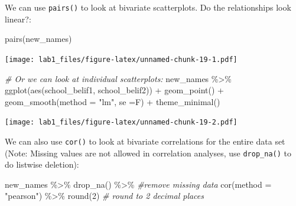 \documentclass[
]{article}
\newenvironment{Shaded}{\begin{snugshade}}{\end{snugshade}}
\newcommand{\AttributeTok}[1]{\textcolor[rgb]{0.77,0.63,0.00}{#1}}
\newcommand{\CommentTok}[1]{\textcolor[rgb]{0.56,0.35,0.01}{\textit{#1}}}
\newcommand{\DecValTok}[1]{\textcolor[rgb]{0.00,0.00,0.81}{#1}}
\newcommand{\FunctionTok}[1]{\textcolor[rgb]{0.00,0.00,0.00}{#1}}
\newcommand{\NormalTok}[1]{#1}
\newcommand{\SpecialCharTok}[1]{\textcolor[rgb]{0.00,0.00,0.00}{#1}}
\newcommand{\StringTok}[1]{\textcolor[rgb]{0.31,0.60,0.02}{#1}}
\begin{document}
We can use \texttt{pairs()} to look at bivariate scatterplots. Do the
relationships look linear?:

\begin{Shaded}
\begin{Highlighting}[]
\FunctionTok{pairs}\NormalTok{(new\_names)}
\end{Highlighting}
\end{Shaded}

\texttt{[image: lab1\_files/figure-latex/unnamed-chunk-19-1.pdf]}

\begin{Shaded}
\begin{Highlighting}[]
\CommentTok{\# Or we can look at individual scatterplots:}
\NormalTok{new\_names }\SpecialCharTok{\%\textgreater{}\%} 
  \FunctionTok{ggplot}\NormalTok{(}\FunctionTok{aes}\NormalTok{(school\_belif1, school\_belif2)) }\SpecialCharTok{+}
  \FunctionTok{geom\_point}\NormalTok{() }\SpecialCharTok{+}
  \FunctionTok{geom\_smooth}\NormalTok{(}\AttributeTok{method =} \StringTok{"lm"}\NormalTok{, }\AttributeTok{se =}\NormalTok{F) }\SpecialCharTok{+}
  \FunctionTok{theme\_minimal}\NormalTok{()}
\end{Highlighting}
\end{Shaded}

\texttt{[image: lab1\_files/figure-latex/unnamed-chunk-19-2.pdf]}

We can also use \texttt{cor()} to look at bivariate correlations for the
entire data set (Note: Missing values are not allowed in correlation
analyses, use \texttt{drop\_na()} to do listwise deletion):

\begin{Shaded}
\begin{Highlighting}[]
\NormalTok{new\_names }\SpecialCharTok{\%\textgreater{}\%} 
  \FunctionTok{drop\_na}\NormalTok{() }\SpecialCharTok{\%\textgreater{}\%} \CommentTok{\#remove missing data}
  \FunctionTok{cor}\NormalTok{(}\AttributeTok{method =} \StringTok{"pearson"}\NormalTok{) }\SpecialCharTok{\%\textgreater{}\%} 
  \FunctionTok{round}\NormalTok{(}\DecValTok{2}\NormalTok{) }\CommentTok{\# round to 2 decimal places }
\end{Highlighting}
\end{Shaded}
\end{document}
